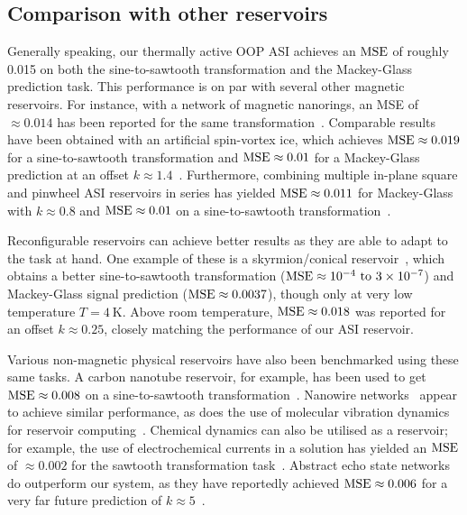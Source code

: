 \subsection{Comparison with other reservoirs}
Generally speaking, our thermally active OOP ASI achieves an $\mathrm{MSE}$ of roughly 0.015 on both the sine-to-sawtooth transformation and the Mackey-Glass prediction task.
This performance is on par with several other magnetic reservoirs.
For instance, with a network of magnetic nanorings, an MSE of $\approx 0.014$ has been reported for the same transformation~\cite{Vidamour2023}.
Comparable results have been obtained with an artificial spin-vortex ice, which achieves $\mathrm{MSE} \approx 0.019$ for a sine-to-sawtooth transformation and $\mathrm{MSE} \approx 0.01$ for a Mackey-Glass prediction at an offset $k \approx 1.4$~\cite{gartside2022reconfigurable}.
Furthermore, combining multiple in-plane square and pinwheel ASI reservoirs in series has yielded $\mathrm{MSE} \approx 0.011$ for Mackey-Glass with $k \approx 0.8$ and $\mathrm{MSE} \approx 0.01$ on a sine-to-sawtooth transformation~\cite{AdaptiveProgrammableRC}. \par
Reconfigurable reservoirs can achieve better results as they are able to adapt to the task at hand.
One example of these is a skyrmion/conical reservoir~\cite{TaskAdaptivePRC}, which obtains a better sine-to-sawtooth transformation ($\MSE \approx \SIrange{e-4}{3e-7}{}$) and Mackey-Glass signal prediction ($\mathrm{MSE} \approx 0.0037$), though only at very low temperature $T = \SI{4}{\kelvin}$.
Above room temperature, $\mathrm{MSE} \approx 0.018$ was reported for an offset $k \approx 0.25$, closely matching the performance of our ASI reservoir. \par
Various non-magnetic physical reservoirs have also been benchmarked using these same tasks.
A carbon nanotube reservoir, for example, has been used to get $\mathrm{MSE} \approx 0.008$ on a sine-to-sawtooth transformation~\cite{CarbonNanotubeRC}.
Nanowire networks~\cite{NanoarchitectonicAtomicSwitch,RC_NNN} appear to achieve similar performance, as does the use of molecular vibration dynamics for reservoir computing~\cite{FewMoleculeReservoir}.
Chemical dynamics can also be utilised as a reservoir; for example, the use of electrochemical currents in a solution has yielded an $\mathrm{MSE}$ of $\approx 0.002$ for the sawtooth transformation task~\cite{ElectrochemicalPRC}. %
Abstract echo state networks do outperform our system, as they have reportedly achieved $\mathrm{MSE} \approx 0.006$ for a very far future prediction of $k \approx 5$~\cite{Moon_2021}. %

